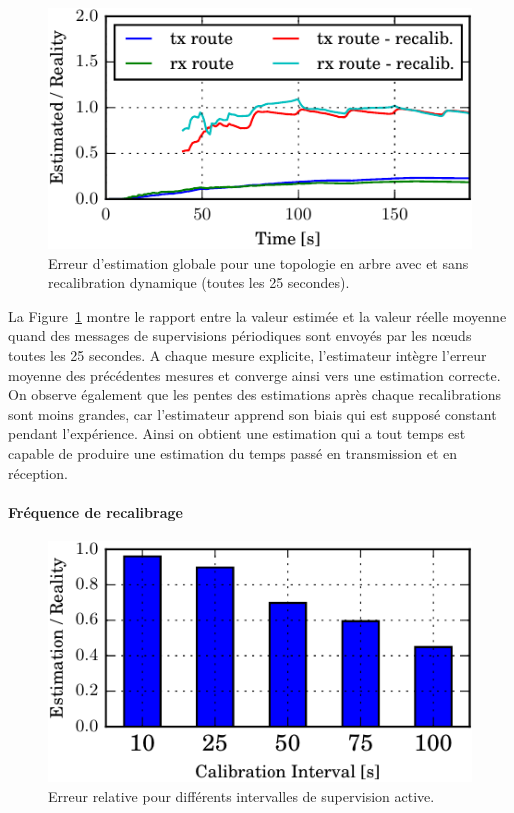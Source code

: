 \begin{figure}[ht]
  \centering
  \includegraphics{img/ratio_recalibration_global-crop.pdf}
  \caption{Erreur d'estimation globale pour une topologie en arbre avec et sans recalibration dynamique (toutes les 25 secondes).}
  \label{supervision:fig:tree_calibration}
\end{figure}

La Figure~\ref{supervision:fig:tree_calibration} montre le rapport entre la valeur estimée et la valeur réelle moyenne quand des messages de supervisions périodiques sont envoyés par les nœuds toutes les 25 secondes.
A chaque mesure explicite, l'estimateur intègre l'erreur moyenne des précédentes mesures et converge ainsi vers une estimation correcte.
On observe également que les pentes des estimations après chaque recalibrations sont moins grandes, car l'estimateur apprend son biais qui est supposé constant pendant l'expérience.
Ainsi on obtient une estimation qui a tout temps est capable de produire une estimation du temps passé en transmission et en réception.

\paragraph{Fréquence de recalibrage}

\begin{figure}[ht]
  \centering
  \includegraphics{img/ratio_recalibration-crop.pdf}
  \caption{Erreur relative pour différents intervalles de supervision active.}
  \label{supervision:fig:frequencies_error}
\end{figure}

